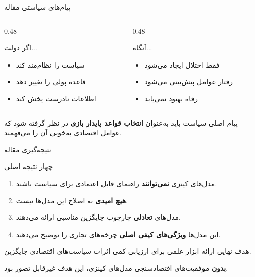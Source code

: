 \documentclass[aspectratio=169,11pt]{beamer}
\newcommand{\highlight}[1]{\textcolor{AccentOrange}{\textbf{#1}}}
\newcommand{\important}[1]{\textcolor{AlertRed}{\textbf{#1}}}
\newcommand{\keyword}[1]{\textcolor{MainBlue}{\textbf{#1}}}
\begin{document}
\begin{frame}{پیام‌های سیاستی مقاله}
	\begin{LTR}
		\begin{columns}[T]
			\begin{column}{0.48\textwidth}
				\begin{alertblock}{اگر دولت...}
					\begin{itemize}
						\item سیاست را نظام‌مند کند
						\item قاعده پولی را تغییر دهد
						\item اطلاعات نادرست پخش کند
					\end{itemize}
				\end{alertblock}
			\end{column}
			\hfill
			\begin{column}{0.48\textwidth}
				\begin{exampleblock}{آنگاه...}
					\begin{itemize}
						\item فقط اختلال ایجاد می‌شود
						\item رفتار عوامل پیش‌بینی می‌شود
						\item رفاه بهبود نمی‌یابد
					\end{itemize}
				\end{exampleblock}
			\end{column}
		\end{columns}
	\end{LTR}
	\vspace{0.4cm}
	\begin{block}{پیام اصلی}
		\centering
		\large
		سیاست باید به‌عنوان \highlight{انتخاب قواعد پایدار بازی} در نظر گرفته شود که عوامل اقتصادی به‌خوبی آن را می‌فهمند.
	\end{block}
\end{frame}

\begin{frame}{نتیجه‌گیری مقاله}
	\begin{block}{چهار نتیجه اصلی}
		\begin{enumerate}
			\item مدل‌های کینزی \important{نمی‌توانند} راهنمای قابل اعتمادی برای سیاست باشند.
			\item \important{هیچ امیدی} به اصلاح این مدل‌ها نیست.
			\item مدل‌های \keyword{تعادلی} چارچوب جایگزین مناسبی ارائه می‌دهند.
			\item این مدل‌ها \highlight{ویژگی‌های کیفی اصلی} چرخه‌های تجاری را توضیح می‌دهند.
		\end{enumerate}
	\end{block}
	\vspace{0.3cm}
	\begin{exampleblock}{هدف نهایی}
		\centering
		ارائه ابزار علمی برای ارزیابی کمی اثرات سیاست‌های اقتصادی جایگزین.
		\vspace{0.2cm}

		\important{بدون} موفقیت‌های اقتصادسنجی مدل‌های کینزی، این هدف غیرقابل تصور بود.
	\end{exampleblock}
\end{frame}
\end{document}

